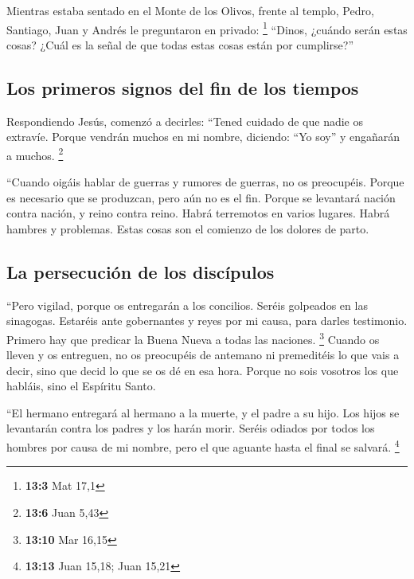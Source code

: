  Mientras estaba sentado en el Monte de los Olivos, frente
al templo, Pedro, Santiago, Juan y Andrés le preguntaron en privado:
\footnote{\textbf{13:3} Mat 17,1}  ``Dinos, ¿cuándo serán
estas cosas? ¿Cuál es la señal de que todas estas cosas están por
cumplirse?''

\hypertarget{los-primeros-signos-del-fin-de-los-tiempos-1}{%
\subsection{Los primeros signos del fin de los
tiempos}\label{los-primeros-signos-del-fin-de-los-tiempos-1}}

 Respondiendo Jesús, comenzó a decirles: ``Tened cuidado
de que nadie os extravíe.  Porque vendrán muchos en mi
nombre, diciendo: ``Yo soy'' y engañarán a muchos. \footnote{\textbf{13:6}
  Juan 5,43}

 ``Cuando oigáis hablar de guerras y rumores de guerras,
no os preocupéis. Porque es necesario que se produzcan, pero aún no es
el fin.  Porque se levantará nación contra nación, y reino
contra reino. Habrá terremotos en varios lugares. Habrá hambres y
problemas. Estas cosas son el comienzo de los dolores de parto.

\hypertarget{la-persecuciuxf3n-de-los-discuxedpulos}{%
\subsection{La persecución de los
discípulos}\label{la-persecuciuxf3n-de-los-discuxedpulos}}

 ``Pero vigilad, porque os entregarán a los concilios.
Seréis golpeados en las sinagogas. Estaréis ante gobernantes y reyes por
mi causa, para darles testimonio.  Primero hay que
predicar la Buena Nueva a todas las naciones. \footnote{\textbf{13:10}
  Mar 16,15}  Cuando os lleven y os entreguen, no os
preocupéis de antemano ni premeditéis lo que vais a decir, sino que
decid lo que se os dé en esa hora. Porque no sois vosotros los que
habláis, sino el Espíritu Santo.

 ``El hermano entregará al hermano a la muerte, y el
padre a su hijo. Los hijos se levantarán contra los padres y los harán
morir.  Seréis odiados por todos los hombres por causa de
mi nombre, pero el que aguante hasta el final se salvará. \footnote{\textbf{13:13}
  Juan 15,18; Juan 15,21}

